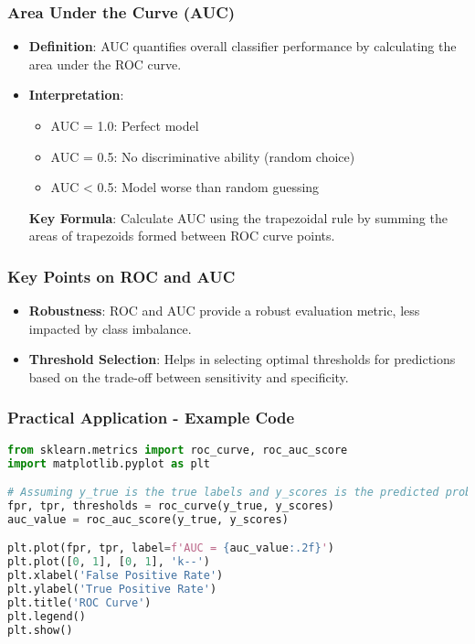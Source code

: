 \documentclass{beamer}
\begin{document}
\begin{frame}[fragile]
    \frametitle{Area Under the Curve (AUC)}
    \begin{itemize}
        \item \textbf{Definition}: AUC quantifies overall classifier performance by calculating the area under the ROC curve.
        \item \textbf{Interpretation}:
        \begin{itemize}
            \item AUC = 1.0: Perfect model
            \item AUC = 0.5: No discriminative ability (random choice)
            \item AUC < 0.5: Model worse than random guessing
        \end{itemize}
        
        \medskip
        \textbf{Key Formula}: Calculate AUC using the trapezoidal rule by summing the areas of trapezoids formed between ROC curve points.
    \end{itemize}
\end{frame}

\begin{frame}[fragile]
    \frametitle{Key Points on ROC and AUC}
    \begin{itemize}
        \item \textbf{Robustness}: ROC and AUC provide a robust evaluation metric, less impacted by class imbalance.
        \item \textbf{Threshold Selection}: Helps in selecting optimal thresholds for predictions based on the trade-off between sensitivity and specificity.
    \end{itemize}
\end{frame}

\begin{frame}[fragile]
    \frametitle{Practical Application - Example Code}
    \begin{lstlisting}[language=Python]
from sklearn.metrics import roc_curve, roc_auc_score
import matplotlib.pyplot as plt

# Assuming y_true is the true labels and y_scores is the predicted probabilities
fpr, tpr, thresholds = roc_curve(y_true, y_scores)
auc_value = roc_auc_score(y_true, y_scores)

plt.plot(fpr, tpr, label=f'AUC = {auc_value:.2f}')
plt.plot([0, 1], [0, 1], 'k--')
plt.xlabel('False Positive Rate')
plt.ylabel('True Positive Rate')
plt.title('ROC Curve')
plt.legend()
plt.show()
    \end{lstlisting}
\end{frame}
\end{document}
